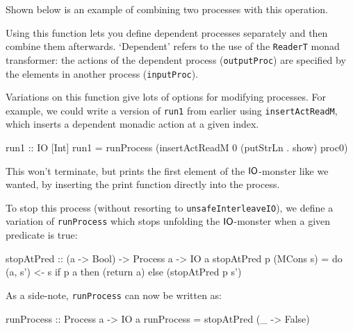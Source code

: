 Shown below is an example of combining two processes with this operation.


Using this function lets you define dependent processes separately and then combine them afterwards. 
`Dependent' refers to the use of the \verb+ReaderT+ monad transformer: the actions of the dependent process (\verb+outputProc+) are specified by the elements in another process (\verb+inputProc+).

Variations on this function give lots of options for modifying processes. For example, we could write a version of \verb+run1+ from earlier using \verb+insertActReadM+, which inserts a dependent monadic action at a given index.

\begin{haskell}
run1 :: IO [Int]
run1 = runProcess (insertActReadM 0 (putStrLn . show) proc0)
\end{haskell}

This won't terminate, but prints the first element of the $\mathsf{IO}$-monster like we wanted, by inserting the print function directly into the process.

To stop this process (without resorting to \verb+unsafeInterleaveIO+), we define a variation of \verb+runProcess+ which stops unfolding the $\mathsf{IO}$-monster when a given predicate is true:

\begin{haskell}
stopAtPred :: (a -> Bool) -> Process a -> IO a
stopAtPred p (MCons s) = do (a, s') <- s
                            if p a then (return a) else (stopAtPred p s')
\end{haskell}
 
As a side-note, \verb+runProcess+ can now be written as:
 
 \begin{haskell}
runProcess :: Process a -> IO a
runProcess = stopAtPred (\_ -> False)
\end{haskell}

